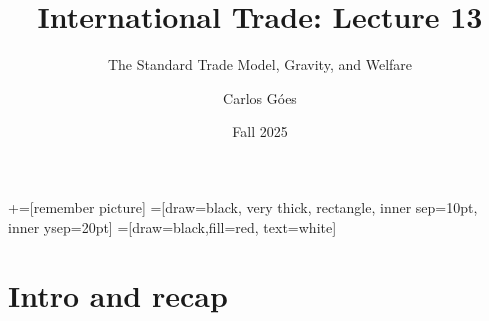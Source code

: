 \documentclass[notes,11pt, aspectratio=169, xcolor=table]{beamer}
\title[]{International Trade: Lecture 13}
\subtitle[]{The Standard Trade Model, Gravity, and Welfare}
\author[Góes]
{Carlos Góes\inst{1}}
\date{Fall 2025}
\institute[GWU]{\inst{1} George Washington University }
\begin{document}
\newcommand\marktopleft[1]{%
    \tikz[overlay,remember picture] 
        \node (marker-#1-a) at (-.3em,.3em) {};%
}
\newcommand\markbottomright[2]{%
    \tikz[overlay,remember picture] 
        \node (marker-#1-b) at (0em,0em) {};%
}
+=[remember picture] 
 =[draw=black, very thick, rectangle, inner sep=10pt, inner ysep=20pt]
 =[draw=black,fill=red, text=white]















\frame{\titlepage}
\addtocounter{framenumber}{-1}




\section{Intro and recap}
\end{document}
